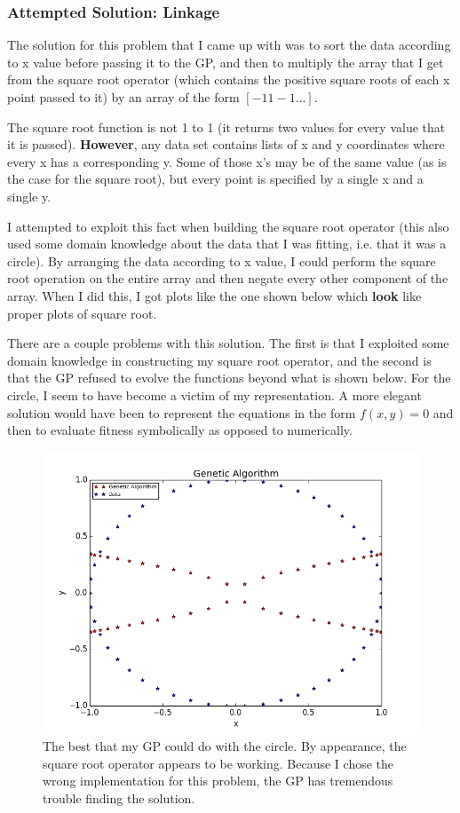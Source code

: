 \documentclass[11pt,amsmath,amssymb]{revtex4}
\begin{document}
\subsubsection{Attempted Solution: Linkage}
The solution for this problem that I came up with was to sort the data according to x value before passing it to the GP, and then to multiply the array that I get from the square root operator (which contains the positive square roots of each x point passed to it) by an array of the form $[-1   1   -1 \dots]$.

The square root function is not 1 to 1 (it returns two values for every value that it is passed). {\bf{However}}, any data set contains lists of x and y coordinates where every x has a corresponding y. Some of those x's may be of the same value (as is the case for the square root), but every point is specified by a single x and a single y.

I attempted to exploit this fact when building the square root operator (this also used some domain knowledge about the data that I was fitting, i.e. that it was a circle). By arranging the data according to x value, I could perform the square root operation on the entire array and then negate every other component of the array. When I did this, I got plots like the one shown below which {\bf{look}} like proper plots of square root.

There are a couple problems with this solution. The first is that I exploited some domain knowledge in constructing my square root operator, and the second is that the GP refused to evolve the functions beyond what is shown below. For the circle, I seem to have become a victim of my representation. A more elegant solution would have been to represent the equations in the form $f(x,y)=0$ and then to evaluate fitness symbolically as opposed to numerically.

\begin{figure}[H]
\center
\includegraphics[scale=0.55]{figure_1.png}
\caption{The best that my GP could do with the circle. By appearance, the square root operator appears to be working. Because I chose the wrong implementation for this problem, the GP has tremendous trouble finding the solution.}
\label{q1}
\end{figure}
\end{document}
